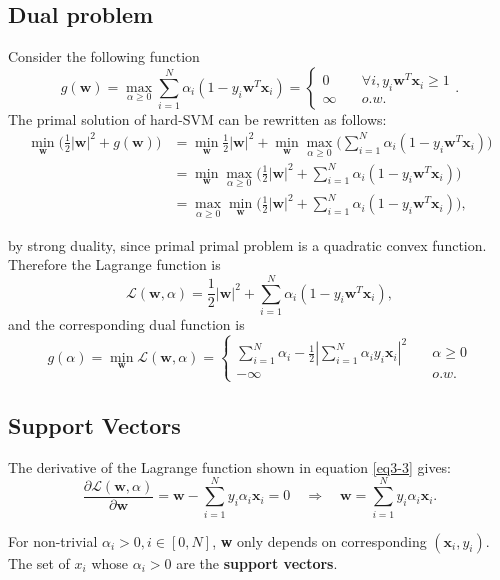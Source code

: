 \documentclass[../main.tex]{subfiles}
\begin{document}
\subsection{Dual problem}
Consider the following function $$
g(\textbf{w}) = \max_{\alpha\geq 0}\sum_{i=1}^{N}\alpha_i(1-y_i\textbf{w}^T\textbf{x}_i) = \left\{
        \begin{array}{ll}
            0 & \quad \forall i, y_i\textbf{w}^T\textbf{x}_i\geq 1 \\
            \infty & \quad o.w.
        \end{array}
    \right.
.$$
The primal solution of hard-SVM can be rewritten as follows:
\begin{equation} \label{eq3-2}
\begin{split}
\min_{\textbf{w}}\big(\frac{1}{2}|\textbf{w}|^2+g(\textbf{w}) \big) & = \min_{\textbf{w}}\frac{1}{2}|\textbf{w}|^2+\min_{\textbf{w}}\max_{\alpha\geq 0}\big(\sum_{i=1}^{N}\alpha_i(1-y_i\textbf{w}^T\textbf{x}_i) \big) \\
 & = \min_{\textbf{w}}\max_{\alpha\geq 0}\big(\frac{1}{2}|\textbf{w}|^2+\sum_{i=1}^{N}\alpha_i(1-y_i\textbf{w}^T\textbf{x}_i) \big) \\
 & = \max_{\alpha\geq 0}\min_{\textbf{w}}\big(\frac{1}{2}|\textbf{w}|^2+\sum_{i=1}^{N}\alpha_i(1-y_i\textbf{w}^T\textbf{x}_i) \big),
\end{split}
\end{equation}

by strong duality, since primal primal problem is a quadratic convex function. Therefore the Lagrange function is $$\mathcal{L}(\textbf{w}, \alpha)=\frac{1}{2}|\textbf{w}|^2+\sum_{i=1}^{N}\alpha_i(1-y_i\textbf{w}^T\textbf{x}_i),$$
and the corresponding dual function is
\begin{equation} \label{eq3-3}
g(\alpha) = \min_{\textbf{w}} \mathcal{L}(\textbf{w}, \alpha) = \left\{
        \begin{array}{ll}
            \sum_{i=1}^N \alpha_i-\frac{1}{2}|\sum_{i=1}^N\alpha_i y_i \textbf{x}_i|^2 & \quad \alpha\geq 0 \\
            -\infty & \quad o.w.
        \end{array}
    \right.
\end{equation}

\subsection{Support Vectors}
The derivative of the Lagrange function shown in equation \ref{eq3-3} gives: $$\frac{\partial \mathcal{L}(\textbf{w}, \alpha)}{\partial \textbf{w}}=\textbf{w}-\sum_{i=1}^N y_i \alpha_i \textbf{x}_i=0 \quad \Rightarrow \quad \textbf{w}=\sum_{i=1}^N y_i \alpha_i \textbf{x}_i.$$

For non-trivial $\alpha_i>0, i\in [0, N]$, \textbf{w} only depends on corresponding $(\textbf{x}_i, y_i)$. The set of $x_i$ whose $\alpha_i >0$ are the \textbf{support vectors}.
\end{document}
